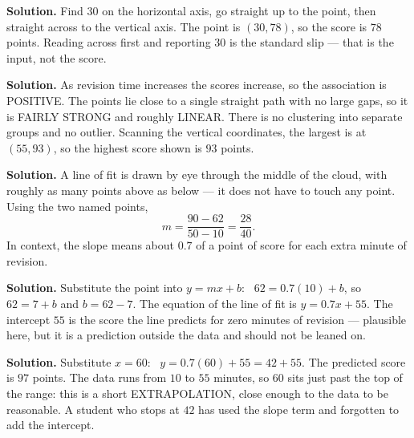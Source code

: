 \documentclass[12pt]{article}
\begin{document}



\textbf{Solution.} Find $30$ on the horizontal axis, go straight up to the point, then straight across to the vertical axis. The point is $(30, 78)$, so the score is $78$ points. Reading across first and reporting $30$ is the standard slip --- that is the input, not the score.



\textbf{Solution.} As revision time increases the scores increase, so the association is POSITIVE. The points lie close to a single straight path with no large gaps, so it is FAIRLY STRONG and roughly LINEAR. There is no clustering into separate groups and no outlier. Scanning the vertical coordinates, the largest is at $(55, 93)$, so the highest score shown is $93$ points.



\textbf{Solution.} A line of fit is drawn by eye through the middle of the cloud, with roughly as many points above as below --- it does not have to touch any point. Using the two named points,
\[
m=\frac{90-62}{50-10}=\frac{28}{40}.
\]
In context, the slope means about $0.7$ of a point of score for each extra minute of revision.



\textbf{Solution.} Substitute the point into $y = mx + b$: \ $62 = 0.7(10) + b$, so $62 = 7 + b$ and $b = 62 - 7$. The equation of the line of fit is $y = 0.7x + 55$. The intercept $55$ is the score the line predicts for zero minutes of revision --- plausible here, but it is a prediction outside the data and should not be leaned on.



\textbf{Solution.} Substitute $x = 60$: \ $y = 0.7(60) + 55 = 42 + 55$. The predicted score is $97$ points. The data runs from $10$ to $55$ minutes, so $60$ sits just past the top of the range: this is a short EXTRAPOLATION, close enough to the data to be reasonable. A student who stops at $42$ has used the slope term and forgotten to add the intercept.
\end{document}
